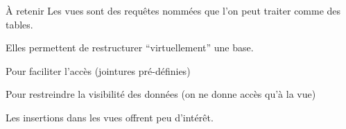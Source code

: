 \begin{frame}{À retenir}
Les \alert{vues} sont des requêtes nommées que l'on peut traiter
comme des tables.

\vfill

Elles permettent de restructurer ``virtuellement''  une base.

\begin{redbullet}
   \item  Pour faciliter l'accès (jointures pré-définies)
   \item Pour restreindre la visibilité des données (on ne donne accès qu'à la vue)
   \item Les insertions dans les vues offrent peu d'intérêt.
\end{redbullet}


\end{frame}

